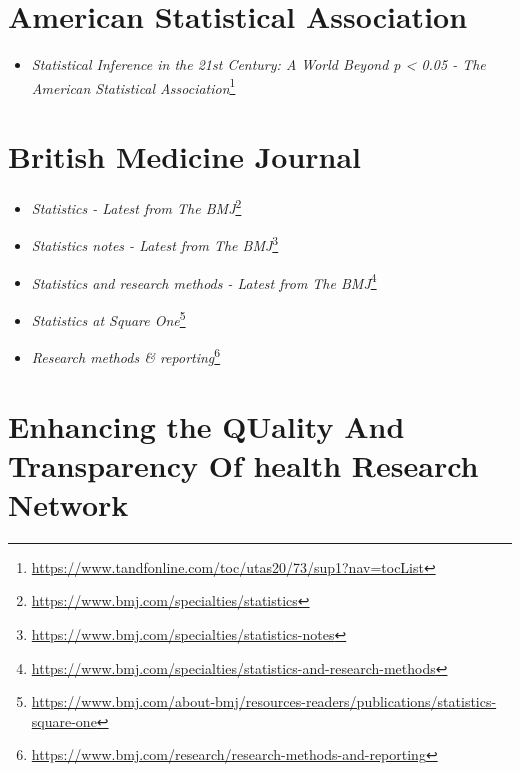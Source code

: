 \documentclass[
]{book}
\providecommand{\tightlist}{%
  \setlength{\itemsep}{0pt}\setlength{\parskip}{0pt}}
\renewcommand{\href}[2]{#2\footnote{\url{#1}}}
\begin{document}
\hypertarget{american-statistical-association}{%
\section*{American Statistical Association}\label{american-statistical-association}}

\begin{itemize}
\tightlist
\item
  \href{https://www.tandfonline.com/toc/utas20/73/sup1?nav=tocList}{\emph{Statistical Inference in the 21st Century: A World Beyond p \textless{} 0.05 - The American Statistical Association}}
\end{itemize}

\hypertarget{british-medicine-journal}{%
\section*{British Medicine Journal}\label{british-medicine-journal}}

\begin{itemize}
\item
  \href{https://www.bmj.com/specialties/statistics}{\emph{Statistics - Latest from The BMJ}}
\item
  \href{https://www.bmj.com/specialties/statistics-notes}{\emph{Statistics notes - Latest from The BMJ}}
\item
  \href{https://www.bmj.com/specialties/statistics-and-research-methods}{\emph{Statistics and research methods - Latest from The BMJ}}
\item
  \href{https://www.bmj.com/about-bmj/resources-readers/publications/statistics-square-one}{\emph{Statistics at Square One}}
\item
  \href{https://www.bmj.com/research/research-methods-and-reporting}{\emph{Research methods \& reporting}}
\end{itemize}

\hypertarget{enhancing-the-quality-and-transparency-of-health-research-network}{%
\section*{Enhancing the QUality And Transparency Of health Research Network}\label{enhancing-the-quality-and-transparency-of-health-research-network}}
\end{document}
